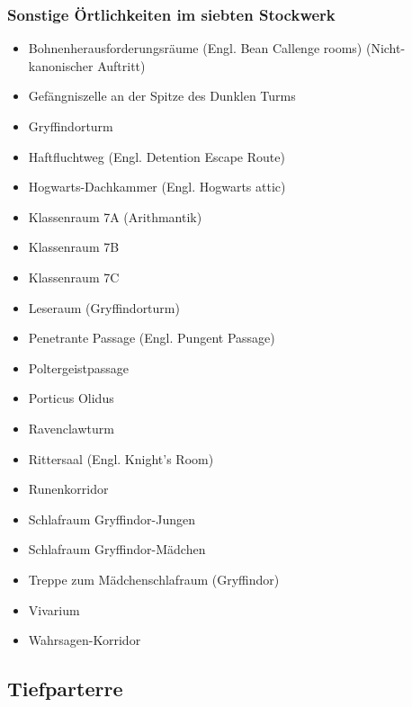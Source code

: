 \documentclass[a4paper, 10pt]{article}
\begin{document}
\subsubsection*{\large Sonstige Örtlichkeiten im siebten Stockwerk}
\vspace{10pt}
\begin{itemize}
    \item Bohnenherausforderungsräume (Engl. Bean Callenge rooms) (Nicht-kanonischer Auftritt)
    \item Gefängniszelle an der Spitze des Dunklen Turms
    \item Gryffindorturm
    \item Haftfluchtweg (Engl. Detention Escape Route)
    \item Hogwarts-Dachkammer (Engl. Hogwarts attic)
    \item Klassenraum 7A (Arithmantik)
    \item Klassenraum 7B
    \item Klassenraum 7C
    \item Leseraum (Gryffindorturm)
    \item Penetrante Passage (Engl. Pungent Passage)
    \item Poltergeistpassage
    \item Porticus Olidus
    \item Ravenclawturm
    \item Rittersaal (Engl. Knight's Room)
    \item Runenkorridor
    \item Schlafraum Gryffindor-Jungen
    \item Schlafraum Gryffindor-Mädchen
    \item Treppe zum Mädchenschlafraum (Gryffindor)
    \item Vivarium
    \item Wahrsagen-Korridor
\end{itemize}

\subsection*{\Large Tiefparterre}
\end{document}
